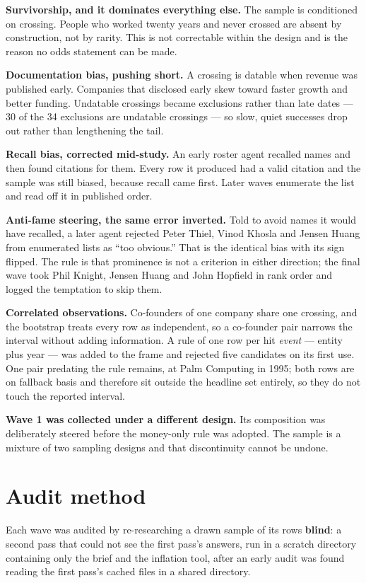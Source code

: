 \documentclass[11pt]{article}
\begin{document}
\textbf{Survivorship, and it dominates everything else.} The sample is
conditioned on crossing. People who worked twenty years and never crossed are
absent by construction, not by rarity. This is not correctable within the design
and is the reason no odds statement can be made.

\textbf{Documentation bias, pushing short.} A crossing is datable when revenue
was published early. Companies that disclosed early skew toward faster growth
and better funding. Undatable crossings became exclusions rather than late
dates --- 30 of the 34 exclusions are undatable crossings --- so slow, quiet
successes drop out rather than lengthening the tail.

\textbf{Recall bias, corrected mid-study.} An early roster agent recalled names
and then found citations for them. Every row it produced had a valid citation
and the sample was still biased, because recall came first. Later waves
enumerate the list and read off it in published order.

\textbf{Anti-fame steering, the same error inverted.} Told to avoid names it
would have recalled, a later agent rejected Peter Thiel, Vinod Khosla and Jensen
Huang from enumerated lists as ``too obvious.'' That is the identical bias with
its sign flipped. The rule is that prominence is not a criterion in either
direction; the final wave took Phil Knight, Jensen Huang and John Hopfield in
rank order and logged the temptation to skip them.

\textbf{Correlated observations.} Co-founders of one company share one crossing,
and the bootstrap treats every row as independent, so a co-founder pair narrows
the interval without adding information. A rule of one row per hit \emph{event}
--- entity plus year --- was added to the frame and rejected five candidates on
its first use. One pair predating the rule remains, at Palm Computing in 1995;
both rows are on fallback basis and therefore sit outside the headline set
entirely, so they do not touch the reported interval.

\textbf{Wave 1 was collected under a different design.} Its composition was
deliberately steered before the money-only rule was adopted. The sample is a
mixture of two sampling designs and that discontinuity cannot be undone.

\section{Audit method}

Each wave was audited by re-researching a drawn sample of its rows
\textbf{blind}: a second pass that could not see the first pass's answers, run
in a scratch directory containing only the brief and the inflation tool, after
an early audit was found reading the first pass's cached files in a shared
directory.
\end{document}
